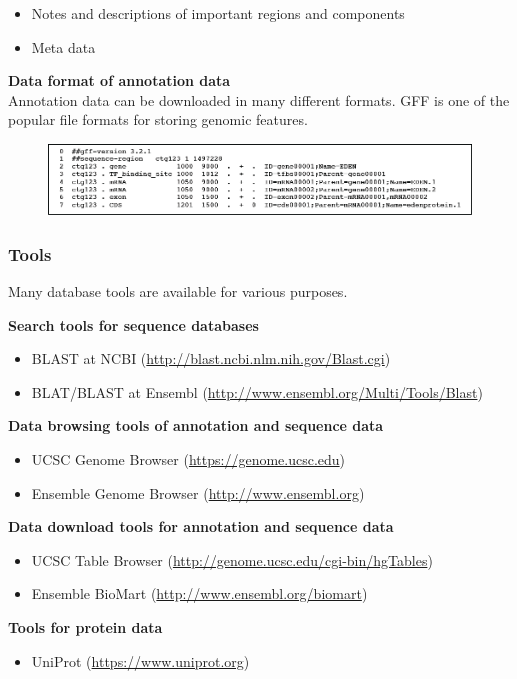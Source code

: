 \begin{itemize}
\item Notes and descriptions of important regions and components
\item Meta data
\end{itemize}

\noindent
\textbf{Data format of annotation data} \\
Annotation data can be downloaded in many different formats. GFF is one of the popular file formats for storing genomic features.
\begin{figure}[H]
  \centering
      \includegraphics[width=\textwidth]{fig05/gff3.png}
\end{figure}

%
%
\subsubsection*{Tools}
Many database tools are available for various purposes.
 
\noindent
\textbf{Search tools for sequence databases}
\begin{itemize}
\item BLAST at NCBI (\href{http://blast.ncbi.nlm.nih.gov/Blast.cgi}{http://blast.ncbi.nlm.nih.gov/Blast.cgi})
\item BLAT/BLAST at Ensembl (\href{http://www.ensembl.org/Multi/Tools/Blast}{http://www.ensembl.org/Multi/Tools/Blast})
\end{itemize}

\noindent
\textbf{Data browsing tools of annotation and sequence data}
\begin{itemize}
\item UCSC Genome Browser (\href{https://genome.ucsc.edu}{https://genome.ucsc.edu})
\item Ensemble Genome Browser (\href{http://www.ensembl.org}{http://www.ensembl.org})
\end{itemize}

\noindent
\textbf{Data download tools for annotation and sequence data}
\begin{itemize}
\item UCSC Table Browser (\href{http://genome.ucsc.edu/cgi-bin/hgTables}{http://genome.ucsc.edu/cgi-bin/hgTables})
\item Ensemble BioMart (\href{http://www.ensembl.org/biomart}{http://www.ensembl.org/biomart})
\end{itemize}

\noindent
\textbf{Tools for protein data}
\begin{itemize}
\item UniProt (\href{https://www.uniprot.org}{https://www.uniprot.org})
\end{itemize}

\bigskip 

%
